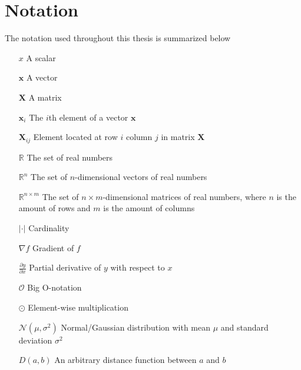 \documentclass[./main.tex]{subfiles}
\begin{document}
\section{Notation}
The notation used throughout this thesis is summarized below

\begin{itemize}[leftmargin=2.0cm,labelsep=0.5cm]
    \item[$x$] A scalar
    \item[$\bm{x}$] A vector
    \item[$\bm{X}$] A matrix
    \item[$\bm{x}_i$] The $i$th element of a vector $\bm{x}$ 
    \item[$\bm{X}_{ij}$] Element located at row $i$ column $j$ in matrix $\bm{X}$
    \item[$\mathbb{R}$] The set of real numbers
    \item[$\mathbb{R}^n$] The set of $n$-dimensional vectors of real numbers
    \item[$\mathbb{R}^{n \times m}$] The set of $n \times m$-dimensional matrices of real numbers, where $n$ is the amount of rows and $m$ is the amount of columns
    \item[$|\cdot|$] Cardinality
    \item[$\nabla f$] Gradient of $f$
    \item[$\frac{\partial y}{\partial x}$] Partial derivative of $y$ with respect to $x$
    \item[$\mathcal{O}$] Big O-notation
    \item[$\odot$] Element-wise multiplication
    \item[$\mathcal{N} \left(\mu, \sigma^2 \right)$] Normal/Gaussian distribution with mean $\mu$ and standard deviation $\sigma^2$
    \item[$D(a, b)$] An arbitrary distance function between $a$ and $b$
\end{itemize}
\end{document}
